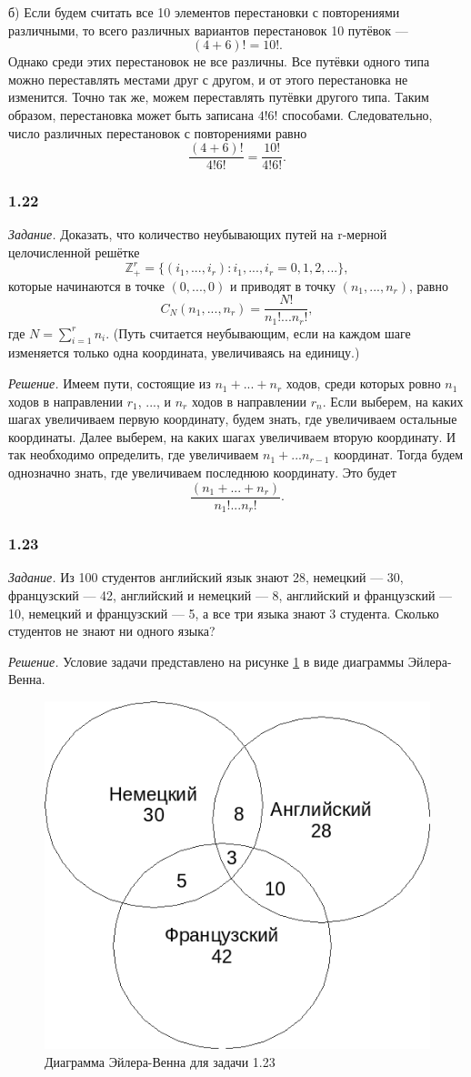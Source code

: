 \documentclass{book}
\begin{document}
б) Если будем считать все 10 элементов перестановки с повторениями различными, то всего различных вариантов перестановок 10 путёвок --- $$(4+6)!=10!.$$ Однако среди этих перестановок не все различны. Все путёвки одного типа можно переставлять местами друг с другом, и от этого перестановка не изменится. Точно так же, можем переставлять путёвки другого типа. Таким образом, перестановка может быть записана $4!6!$ способами. Следовательно, число различных перестановок с повторениями равно $$\frac{(4+6)!}{4!6!}=\frac{10!}{4!6!}.$$

\subsubsection*{1.22}

\textit{Задание.} Доказать, что количество неубывающих путей на r-мерной целочисленной решётке $$\mathbb{Z}_+^r=\{\left(i_1, ..., i_r\right): i_1, ..., i_r=0, 1, 2, ...\},$$ которые начинаются в точке $\left(0, ..., 0\right)$ и приводят в точку $\left(n_1, ..., n_r\right)$, равно $$C_N\left(n_1, ..., n_r\right)=\frac{N!}{n_1!...n_r!},$$ где $N=\sum\limits_{i=1}^rn_i$. (Путь считается неубывающим, если на каждом шаге изменяется только одна координата, увеличиваясь на единицу.)

\textit{Решение.} Имеем пути, состоящие из $n_1+...+n_r$ ходов, среди которых ровно $n_1$ ходов в направлении $r_1$, ..., и $n_r$ ходов в направлении $r_n$. Если выберем, на каких шагах увеличиваем первую координату, будем знать, где увеличиваем остальные координаты. Далее выберем, на каких шагах увеличиваем вторую координату. И так необходимо определить, где увеличиваем $n_1+...n_{r-1}$ координат. Тогда будем однозначно знать, где увеличиваем последнюю координату. Это будет $$\frac{\left(n_1+...+n_r\right)}{n_1!...n_r!}.$$

\subsubsection*{1.23}

\textit{Задание.} Из 100 студентов английский язык знают 28, немецкий --- 30, французский --- 42, английский и немецкий --- 8, английский и французский --- 10, немецкий и французский --- 5, а все три языка знают 3 студента. Сколько студентов не знают ни одного языка?

\textit{Решение.} Условие задачи представлено на рисунке \ref{fig:123} в виде диаграммы Эйлера-Венна. 

\begin{figure}[h!]
  \centering
  \includegraphics[width=.4\textwidth]{./pictures/1_23.png}
  \caption{Диаграмма Эйлера-Венна для задачи 1.23}
  \label{fig:123}
\end{figure}
\end{document}
